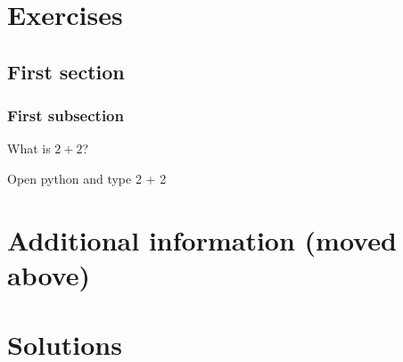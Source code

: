 \documentclass[oneside]{book}
\begin{document}
\chapter{Exercises}

\section{First section}

\subsection{First subsection}

\begin{exercise}[subtitle={Simple Addition}]
  What is \(2 + 2\)?
\end{exercise}

\begin{additionalinformation}
Open python and type 2 + 2
\end{additionalinformation}

\chapter{Additional information (moved above)}

\chapter{Solutions}
\end{document}
